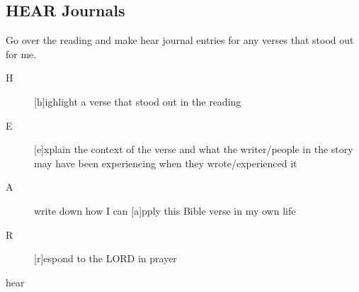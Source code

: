 \documentclass[11pt]{article}
\begin{document}
\subsection{HEAR Journals}
\label{sec:org00cd323}
Go over the reading and make hear journal entries for any verses
that stood out for me.

\begin{description}
\item[{H}] [h]ighlight a verse that stood out in the reading
\item[{E}] [e]xplain the context of the verse and what the writer/people in the story may have been experiencing when they wrote/experienced it
\item[{A}] write down how I can [a]pply this Bible verse in my own life
\item[{R}] [r]espond to the LORD in prayer
\end{description}

hear
\end{document}
